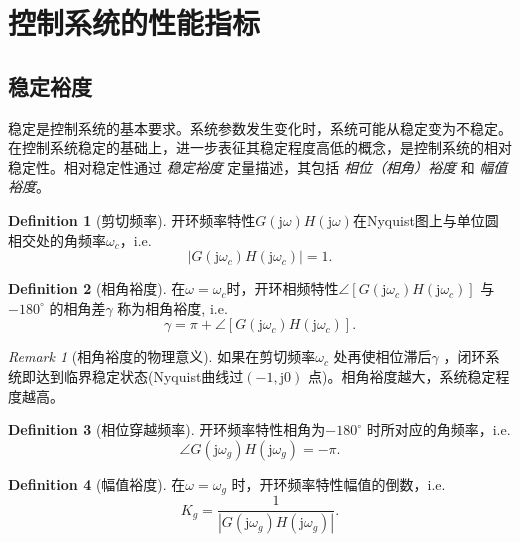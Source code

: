 \documentclass[14pt,a4paper]{article}
\theoremstyle{plain}
\theoremstyle{definition}
\newtheorem*{dfn}{Definition}
\theoremstyle{remark}
\newtheorem{rmk}{Remark}[section]
\theoremstyle{plain}
\theoremstyle{plain}
\theoremstyle{plain}
\theoremstyle{definition}
\theoremstyle{remark}
\numberwithin{equation}{section}
\begin{document}
	\newpage
	\section{控制系统的性能指标}%
	\label{sec:控制系统的性能指标}
	
		\subsection{稳定裕度}%
		\label{sub:稳定裕度}

			稳定是控制系统的基本要求。系统参数发生变化时，系统可能从稳定变为不稳定。在控制系统稳定的基础上，进一步表征其稳定程度高低的概念，是控制系统的相对稳定性。相对稳定性通过 \emph{稳定裕度} 定量描述，其包括 \emph{相位（相角）裕度} 和 \emph{幅值裕度}。


			\begin{dfn}[剪切频率]  
			\label{dfn:剪切频率}
			开环频率特性$G(\mathrm{j} \omega)H(\mathrm{j} \omega)$在Nyquist图上与单位圆相交处的角频率$\omega_c$，i.e. 
			 \[
				 \left| G(\mathrm{j} \omega_c)H(\mathrm{j}\omega_c ) \right| = 1
			.\] 
			\end{dfn} 

			\begin{dfn}[相角裕度]  
			\label{dfn:相角裕度}
			在$\omega = \omega_c$时，开环相频特性$\angle [G(\mathrm j \omega_c)H(\mathrm j\omega_c)]$ 与$-180^\circ$ 的相角差$\gamma$ 称为相角裕度, i.e.  
			\[
				\gamma = \pi + \angle [G(\mathrm{j} \omega_c)H(\mathrm j \omega_c)] 
			.\] 
			\end{dfn} 
			\begin{rmk}[相角裕度的物理意义]  
			\label{rmk:相角裕度的物理意义}
			如果在剪切频率$\omega_c$ 处再使相位滞后$\gamma$ ，闭环系统即达到临界稳定状态(Nyquist曲线过$(-1,\mathrm{j} 0)$ 点)。相角裕度越大，系统稳定程度越高。
			\end{rmk}

			\begin{dfn}[相位穿越频率]  
			\label{dfn:相位穿越频率}
				开环频率特性相角为$-180^\circ$ 时所对应的角频率，i.e. 
				\[
					\angle G(\mathrm{j} \omega_g)H(\mathrm{j} \omega_g) = -\pi
				.\] 
			\end{dfn} 


			\begin{dfn}[幅值裕度]  
			\label{dfn:幅值裕度}
				在$\omega=\omega_g$ 时，开环频率特性幅值的倒数，i.e. 
				\[
					K_g = \dfrac{1}{\left| G(\mathrm{j} \omega_g)H(\mathrm{j} \omega_g) \right| }
				.\] 
			\end{dfn} 
\end{document}
